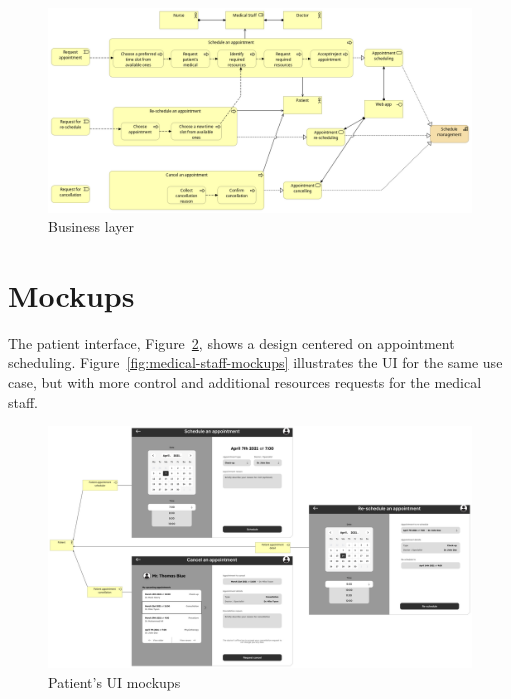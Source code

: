 \documentclass[11pt,english,a4paper,twoside]{article}
\begin{document}
\begin{figure}[ht]
    \centering
    \includegraphics[width=\textwidth]{./fig/Business.png}
    \caption{Business layer}
    \label{fig:business}
\end{figure}

\section{Mockups}

The patient interface, Figure~\ref{fig:patient-mockups}, shows
a design centered on appointment scheduling.
Figure~\ref{fig:medical-staff-mockups} illustrates the UI for the
same use case, but with more control and additional resources requests
for the medical staff.

\begin{figure}[H]
    \centering
    \includegraphics[width=\textwidth]{./fig/Business Frontend Patient.png}
    \caption{Patient's UI mockups}
    \label{fig:patient-mockups}
\end{figure}
\end{document}
